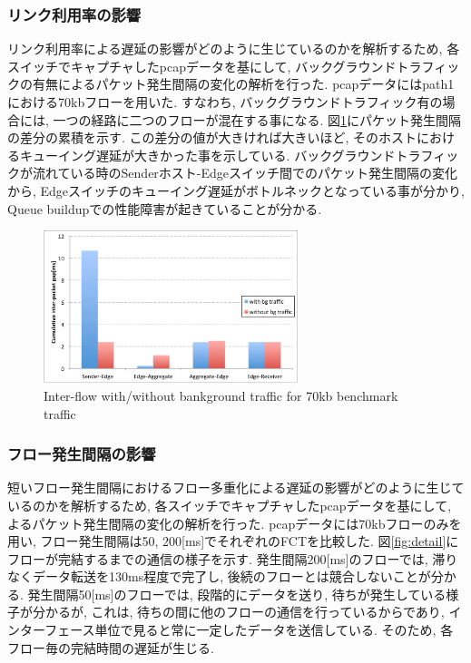 \documentclass[10pt, a4paper, twocolumn]{jsarticle}
\begin{document}
\subsubsection{リンク利用率の影響}
リンク利用率による遅延の影響がどのように生じているのかを解析するため, 各スイッチでキャプチャしたpcapデータを基にして,
バックグラウンドトラフィックの有無によるパケット発生間隔の変化の解析を行った.
pcapデータにはpath1における70kbフローを用いた.
すなわち, バックグラウンドトラフィック有の場合には, 一つの経路に二つのフローが混在する事になる.
図\ref{fig:inter-packet}にパケット発生間隔の差分の累積を示す.
この差分の値が大きければ大きいほど, そのホストにおけるキューイング遅延が大きかった事を示している.
バックグラウンドトラフィックが流れている時のSenderホスト-Edgeスイッチ間でのパケット発生間隔の変化から,
Edgeスイッチのキューイング遅延がボトルネックとなっている事が分かり, Queue buildupでの性能障害が起きていることが分かる.

\begin{figure}[h]
    \begin{center}
    \includegraphics[autoebb, width=210pt]{./img/inter_packet.pdf}
    \caption{Inter-flow with/without bankground traffic for 70kb benchmark
    traffic}
    \label{fig:inter-packet}
    \end{center}
\end{figure}

\subsubsection{フロー発生間隔の影響}
短いフロー発生間隔におけるフロー多重化による遅延の影響がどのように生じているのかを解析するため, 各スイッチでキャプチャしたpcapデータを基にして,
よるパケット発生間隔の変化の解析を行った.
pcapデータには70kbフローのみを用い, フロー発生間隔は50, 200[ms]でそれぞれのFCTを比較した.
図\ref{fig:detail}にフローが完結するまでの通信の様子を示す.
発生間隔200[ms]のフローでは, 滞りなくデータ転送を130ms程度で完了し, 後続のフローとは競合しないことが分かる.
発生間隔50[ms]のフローでは, 段階的にデータを送り, 待ちが発生している様子が分かるが, これは, 待ちの間に他のフローの通信を行っているからであり,
インターフェース単位で見ると常に一定したデータを送信している.
そのため, 各フロー毎の完結時間の遅延が生じる.
\end{document}
